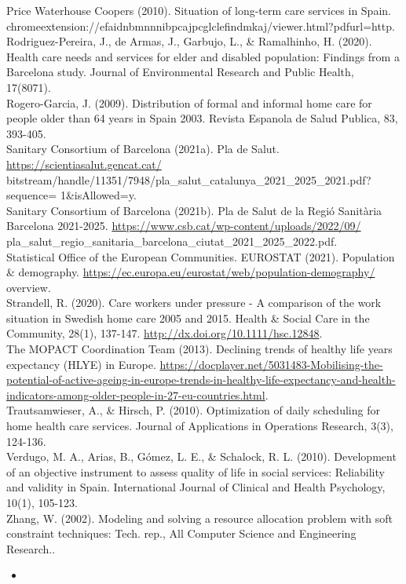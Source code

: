 \documentclass[10pt]{article}
\begin{document}
Price Waterhouse Coopers (2010). Situation of long-term care services in Spain. chromeextension://efaidnbmnnnibpcajpcglclefindmkaj/viewer.html?pdfurl=http.\\
Rodriguez-Pereira, J., de Armas, J., Garbujo, L., \& Ramalhinho, H. (2020). Health care needs and services for elder and disabled population: Findings from a Barcelona study. Journal of Environmental Research and Public Health, 17(8071).\\
Rogero-Garcia, J. (2009). Distribution of formal and informal home care for people older than 64 years in Spain 2003. Revista Espanola de Salud Publica, 83, 393-405.\\
Sanitary Consortium of Barcelona (2021a). Pla de Salut. \href{https://scientiasalut.gencat.cat/}{https://scientiasalut.gencat.cat/} bitstream/handle/11351/7948/pla\_salut\_catalunya\_2021\_2025\_2021.pdf?sequence= 1\&isAllowed=y.\\
Sanitary Consortium of Barcelona (2021b). Pla de Salut de la Regió Sanitària Barcelona 2021-2025. \href{https://www.csb.cat/wp-content/uploads/2022/09/}{https://www.csb.cat/wp-content/uploads/2022/09/} pla\_salut\_regio\_sanitaria\_barcelona\_ciutat\_2021\_2025\_2022.pdf.\\
Statistical Office of the European Communities. EUROSTAT (2021). Population \& demography. \href{https://ec.europa.eu/eurostat/web/population-demography/}{https://ec.europa.eu/eurostat/web/population-demography/} overview.\\
Strandell, R. (2020). Care workers under pressure - A comparison of the work situation in Swedish home care 2005 and 2015. Health \& Social Care in the Community, 28(1), 137-147. \href{http://dx.doi.org/10.1111/hsc.12848}{http://dx.doi.org/10.1111/hsc.12848}.\\
The MOPACT Coordination Team (2013). Declining trends of healthy life years expectancy (HLYE) in Europe. \href{https://docplayer.net/5031483-Mobilising-the-potential-of-active-ageing-in-europe-trends-in-healthy-life-expectancy-and-health-indicators-among-older-people-in-27-eu-countries.html}{https://docplayer.net/5031483-Mobilising-the-potential-of-active-ageing-in-europe-trends-in-healthy-life-expectancy-and-health-indicators-among-older-people-in-27-eu-countries.html}.\\
Trautsamwieser, A., \& Hirsch, P. (2010). Optimization of daily scheduling for home health care services. Journal of Applications in Operations Research, 3(3), 124-136.\\
Verdugo, M. A., Arias, B., Gómez, L. E., \& Schalock, R. L. (2010). Development of an objective instrument to assess quality of life in social services: Reliability and validity in Spain. International Journal of Clinical and Health Psychology, 10(1), 105-123.\\
Zhang, W. (2002). Modeling and solving a resource allocation problem with soft constraint techniques: Tech. rep., All Computer Science and Engineering Research..

\begin{itemize}
  \item 
\end{itemize}
\end{document}
